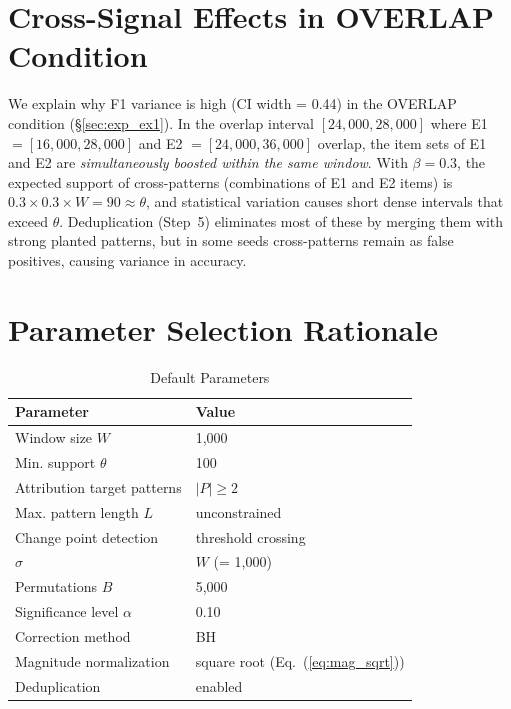 \section{Cross-Signal Effects in OVERLAP Condition}\label{app:overlap_analysis}

We explain why F1 variance is high (CI width = 0.44) in the OVERLAP condition
(\S\ref{sec:exp_ex1}).
In the overlap interval $[24{,}000, 28{,}000]$ where
E1 $= [16{,}000, 28{,}000]$ and E2 $= [24{,}000, 36{,}000]$ overlap,
the item sets of E1 and E2 are \emph{simultaneously boosted within the same window}.
With $\beta = 0.3$, the expected support of cross-patterns
(combinations of E1 and E2 items) is
$0.3 \times 0.3 \times W = 90 \approx \theta$,
and statistical variation causes short dense intervals that exceed $\theta$.
Deduplication (Step~5) eliminates most of these by merging them
with strong planted patterns, but in some seeds cross-patterns remain as false positives,
causing variance in accuracy.

\section{Parameter Selection Rationale}\label{app:params}

\begin{table}[h]
\caption{Default Parameters}
\label{tab:default_params}
\centering
\begin{tabular}{ll}
\toprule
Parameter & Value \\
\midrule
Window size $W$ & 1{,}000 \\
Min. support $\theta$ & 100 \\
Attribution target patterns & $|P| \geq 2$ \\
Max. pattern length $L$ & unconstrained\footnotemark[1] \\
Change point detection & threshold crossing \\
$\sigma$ & $W$ (= 1{,}000) \\
Permutations $B$ & 5{,}000 \\
Significance level $\alpha$ & 0.10 \\
Correction method & BH \\
Magnitude normalization & square root (Eq.~(\ref{eq:mag_sqrt})) \\
Deduplication & enabled \\
\bottomrule
\end{tabular}
\end{table}

